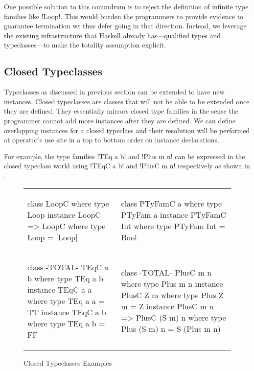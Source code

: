 \documentclass[format=sigplan,manuscript,review,screen,nonacm,margin=1in]{acmart}
\begin{document}
One possible solution to this conundrum is to reject the definition of infinite type families
like !Loop!. This would burden the programmers to provide evidence
to guarantee termination we thus defer going in that direction.
Instead, we leverage the existing infrastructure that Haskell already has---qualified
types and typeclasses---to make the totality assumption explicit.

\subsection{Closed Typeclasses}
Typeclasses as discussed in previous section can be extended to have new instances. Closed typeclasses
are classes that will not be able to be extended once they are defined. They essentially
mirrors closed type families in the sense the programmer cannot add more instances after they
are defined. We can define overlapping instances for a closed typeclass and their resolution
will be performed at operator's use site in a top to bottom order on instance declarations.

For example, the type families !TEq a b! and !Plus m n! can be expressed
in the closed typeclass world using !TEqC a b! and !PlusC m n! respectively as shown in .
\begin{figure}[ht]
  \begin{tabular}{l l}
\begin{code}
class LoopC where
  type Loop
  instance LoopC => LoopC where
    type Loop = [Loop]
\end{code}&%
\begin{code}
class PTyFamC a where
  type PTyFam a
  instance PTyFamC Int where
    type PTyFam Int = Bool
\end{code}\\    
\begin{code}
class {-TOTAL-} TEqC a b where
  type TEq a b
  instance TEqC a a where
    type TEq a a = TT
  instance TEqC a b where
    type TEq a b = FF  
\end{code}&%
\begin{code}
class {-TOTAL-} PlusC m n where
  type Plus m n
  instance PlusC Z m where
    type Plus Z m = Z
  instance PlusC m n => PlusC (S m) n where
    type Plus (S m) n = S (Plus m n)  
\end{code}
  \end{tabular}
  \caption{Closed Typeclasses Examples}
  \label{fig:closed-tc-examples}
\end{figure}
\end{document}
